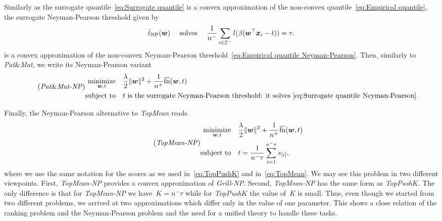 \documentclass[11pt,a4paper]{article}
\theoremstyle{definition}
\newcommand{\norm}[1]{\|#1\|}
\newcommand{\minimize}{\operatorname*{minimize}}
\newcommand{\st}{\operatorname{subject\ to}}
\newcommand{\I}{\mathcal{I}}
\newcommand{\fns}{\overline{\textnormal{fn}}}
\newcommand{\toppushk}{\textit{TopPush$K$}\xspace}
\newcommand{\patmat}{\textit{Pat}\textup{\&}\textit{Mat}\xspace}
\newcommand{\topmean}{\textit{TopMean}\xspace}
\newcommand{\grillnp}{\textit{Grill-NP}\xspace}
\newcommand{\patmatnp}{\textit{Pat}\textup{\&}\textit{Mat-NP}\xspace}
\newcommand{\topmeannp}{\textit{TopMean-NP}\xspace}
\begin{document}
Similarly as the surrogate quantile~\eqref{eq:Surrogate quantile} is a convex approximation of the non-convex quantile~\eqref{eq:Empirical quantile}, the surrogate Neyman-Pearson threshold given by 
\begin{equation}\label{eq:Surrogate quantile Neyman-Pearson} 
  \bar{t}_{\rm NP}(\bm{w})\quad \text{ solves }\quad \frac1{n^-}\sum_{i \in \I^-}l(\beta(\bm{w}^\top \bm{x}_i - t)) = \tau.
\end{equation}
is a convex approximation of the non-convex Neyman-Pearson threshold~\eqref{eq:Empirical quantile Neyman-Pearson}. Then, similarly to \patmat, we write its Neyman-Pearson variant
\begin{equation}\label{eq:PatMat Neyman-Pearson}\tag{\patmatnp}
  \begin{aligned}
    \minimize_{\bm{w}, t} & \quad \frac{\lambda}{2}\norm{\bm{w}}^2 + \frac{1}{n^+}\fns(\bm{w},t)\\
    \st                   & \quad t \text{ is the surrogate Neyman-Pearson threshold: it solves }\eqref{eq:Surrogate quantile Neyman-Pearson}.
  \end{aligned}
\end{equation}

Finally, the Neyman-Pearson alternative to \topmean reads
\begin{equation}\label{eq:TopMean Neyman-Pearson}\tag{\topmeannp}
  \begin{aligned}
    \minimize_{\bm{w}, t} & \quad \frac{\lambda}{2}\norm{\bm{w}}^2 + \frac{1}{n^+}\fns(\bm{w},t) \\
    \st                   & \quad t = \frac{1}{n^-\tau}\sum_{i=1}^{n^-\tau}s_{[i]},
  \end{aligned}
\end{equation}
where we use the same notation for the scores as we used in~\eqref{eq:TopPushK} and in~\eqref{eq:TopMean}. We may see this problem in two different viewpoints. First, \topmeannp provides a convex approximation of \grillnp. Second, \topmeannp has the same form as \toppushk. The only difference is that for \topmeannp we have~$K = n^- \tau$ while for \toppushk the value of~$K$ is small. Thus, even though we started from two different problems, we arrived at two approximations which differ only in the value of one parameter. This shows a close relation of the ranking problem and the Neyman-Pearson problem and the need for a unified theory to handle these tasks.


\end{document}
